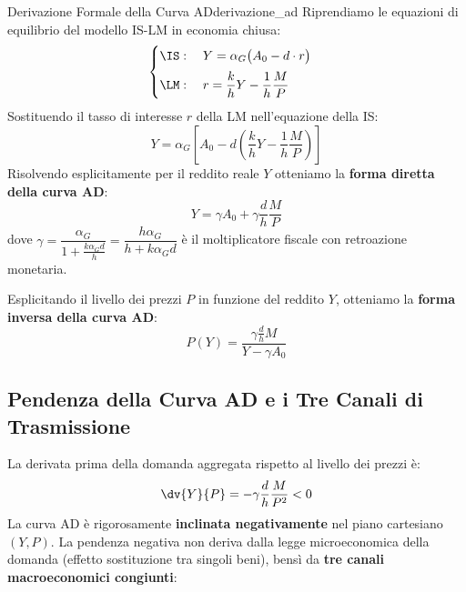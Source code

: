 \begin{modello}{Derivazione Formale della Curva AD}{derivazione_ad}
Riprendiamo le equazioni di equilibrio del modello IS-LM in economia chiusa:
\begin{equation}
    \begin{cases}
        \IS: \quad Y = \alpha_G \big( A_0 - d \cdot r \big) \\[0.5em]
        \LM: \quad r = \dfrac{k}{h} Y - \dfrac{1}{h}\dfrac{M}{P}
    \end{cases}
\end{equation}
Sostituendo il tasso di interesse $r$ della LM nell'equazione della IS:
\begin{equation}
    Y = \alpha_G \left[ A_0 - d \left( \frac{k}{h} Y - \frac{1}{h}\frac{M}{P} \right) \right]
\end{equation}
Risolvendo esplicitamente per il reddito reale $Y$ otteniamo la \textbf{forma diretta della curva AD}:
\begin{equation}
    Y = \gamma A_0 + \gamma \frac{d}{h} \frac{M}{P} \label{eq:ad_diretta}
\end{equation}
dove $\gamma = \dfrac{\alpha_G}{1 + \frac{k \alpha_G d}{h}} = \dfrac{h \alpha_G}{h + k \alpha_G d}$ è il moltiplicatore fiscale con retroazione monetaria.

Esplicitando il livello dei prezzi $P$ in funzione del reddito $Y$, otteniamo la \textbf{forma inversa della curva AD}:
\begin{equation}
    P(Y) = \frac{\gamma \frac{d}{h} M}{Y - \gamma A_0} \label{eq:ad_inversa}
\end{equation}
\end{modello}

\subsection{Pendenza della Curva AD e i Tre Canali di Trasmissione}
La derivata prima della domanda aggregata rispetto al livello dei prezzi è:
\begin{equation}
    \dv{Y}{P} = -\gamma \frac{d}{h} \frac{M}{P^2} < 0
\end{equation}
La curva AD è rigorosamente \textbf{inclinata negativamente} nel piano cartesiano $(Y, P)$.
La pendenza negativa non deriva dalla legge microeconomica della domanda (effetto sostituzione tra singoli beni), bensì da \textbf{tre canali macroeconomici congiunti}:

